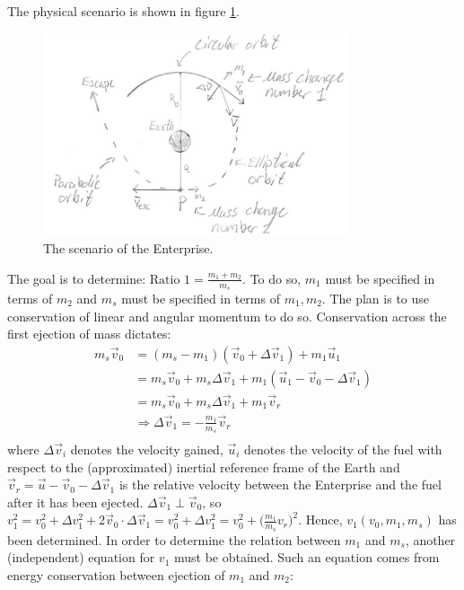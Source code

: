 \begin{example}
\begin{enumerate}
		The physical scenario is shown in figure \ref{fig:ent}.		
		\begin{figure}[h]
			\captionsetup{width=1\textwidth}
			\centering
			\includegraphics[width=0.8\textwidth]{figures/ent}
			\caption{The scenario of the Enterprise.}
			\label{fig:ent}
		\end{figure}
		The goal is to determine: $\text{Ratio 1}=\frac{m_1+m_2}{m_s}$. To do so, $m_1$ must be specified in terms of $m_2$ and $m_s$ must be specified in terms of $m_1,m_2$. The plan is to use conservation of linear and angular momentum to do so. Conservation across the first ejection of mass dictates:
		\begin{equation}
			\begin{split}
				m_s\vec{v}_0&=(m_s-m_1)(\vec{v}_0+\Delta\vec{v}_1)+m_1\vec{u}_1\\
				&=m_s\vec{v}_0+m_s\Delta\vec{v}_1+m_1(\vec{u}_1-\vec{v}_0-\Delta\vec{v}_1)\\
				&=m_s\vec{v}_0+m_s\Delta\vec{v}_1+m_1\vec{v}_r\\
				&\Rightarrow \Delta \vec{v}_1=-\frac{m_1}{m_s}\vec{v}_r\\
			\end{split}
		\end{equation} 
		where $\Delta \vec{v}_i$ denotes the velocity gained, $\vec{u}_i$ denotes the velocity of the fuel with respect to the (approximated) inertial reference frame of the Earth and $\vec{v}_r=\vec{u}-\vec{v}_0-\Delta\vec{v}_1$ is the relative velocity between the Enterprise and the fuel after it has been ejected. $\Delta \vec{v}_1\perp \vec{v}_0$, so $v_1^2=v_0^2+\Delta v_1^2+2\vec{v}_0\cdot \Delta \vec{v}_1=v_0^2+\Delta v_1^2=v_0^2+\big(\frac{m_1}{m_s}v_r\big)^2$. Hence, $v_1(v_0,m_1,m_s)$ has been determined. In order to determine the relation between $m_1$ and $m_s$, another (independent) equation for $v_1$ must be obtained. Such an equation comes from energy conservation between ejection of $m_1$ and $m_2$:

\end{enumerate}
\end{example}
